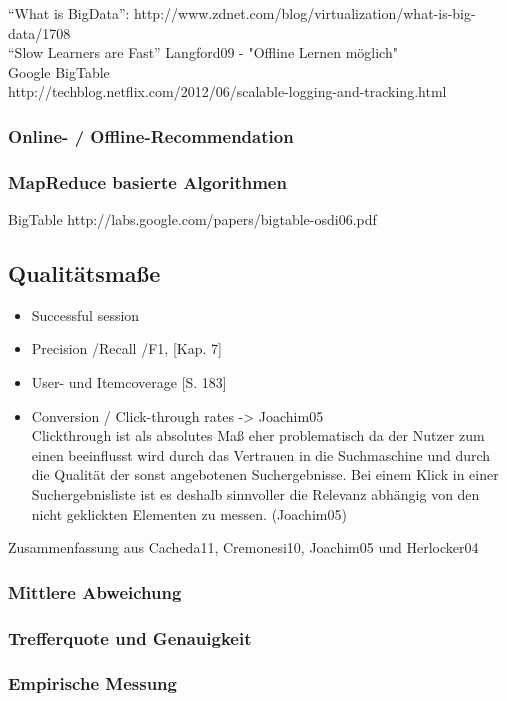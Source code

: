 \citep{Toscher:2008:INA:1722149.1722153}

``What is BigData'': http://www.zdnet.com/blog/virtualization/what-is-big-data/1708 \\
``Slow Learners are Fast'' Langford09 - "Offline Lernen möglich" \\
Google BigTable \\
http://techblog.netflix.com/2012/06/scalable-logging-and-tracking.html

\subsubsection{Online- / Offline-Recommendation}
\subsubsection{MapReduce basierte Algorithmen}
\citep{mapred008}
\citep{jiang11}


BigTable http://labs.google.com/papers/bigtable-osdi06.pdf 

\subsection{Qualitätsmaße}\label{sec:measures}

	\begin{itemize}
	\item Successful session \citep{hb_18,Smyth05alive-user}
	\item Precision /Recall /F1, \citep{rs}[Kap. 7]
	\item User- und Itemcoverage \citep{rs}[S. 183]
	\item Conversion / Click-through rates -> Joachim05 \\
	Clickthrough ist als absolutes Maß eher problematisch da der Nutzer zum einen beeinflusst wird durch das Vertrauen in die Suchmaschine und durch die Qualität der sonst angebotenen Suchergebnisse. Bei einem Klick in einer Suchergebnisliste ist es deshalb sinnvoller die Relevanz abhängig von den nicht geklickten Elementen zu messen. (Joachim05)
	\end{itemize}

Zusammenfassung aus Cacheda11, Cremonesi10, Joachim05 und Herlocker04

\subsubsection*{Mittlere Abweichung}\newpage
\subsubsection*{Trefferquote und Genauigkeit}\newpage
\subsubsection*{Empirische Messung}\newpage

\newpage
